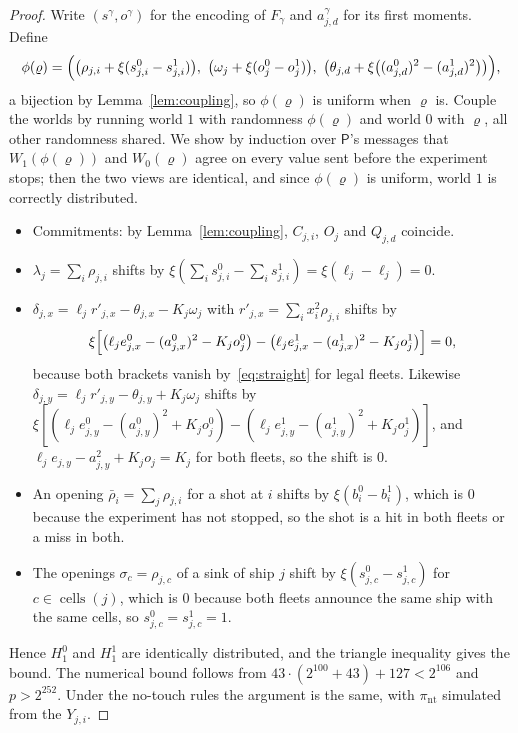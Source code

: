\documentclass[11pt]{article}
\theoremstyle{definition}
\theoremstyle{remark}
\newcommand{\cells}{\operatorname{cells}}
\begin{document}
\begin{proof}
Write $(s^\gamma,o^\gamma)$ for the encoding of $F_\gamma$ and $a^\gamma_{j,d}$ for its first moments. Define
\[
  \phi(\varrho)=\Bigl(\bigl(\rho_{j,i}+\xi(s^0_{j,i}-s^1_{j,i})\bigr),\ \bigl(\omega_j+\xi(o^0_j-o^1_j)\bigr),\ \bigl(\theta_{j,d}+\xi\bigl((a^0_{j,d})^2-(a^1_{j,d})^2\bigr)\bigr)\Bigr),
\]
a bijection by Lemma~\ref{lem:coupling}, so $\phi(\varrho)$ is uniform when $\varrho$ is. Couple the worlds by running world $1$ with randomness $\phi(\varrho)$ and world $0$ with $\varrho$, all other randomness shared. We show by induction over $\mathsf P$'s messages that $W_1(\phi(\varrho))$ and $W_0(\varrho)$ agree on every value sent before the experiment stops; then the two views are identical, and since $\phi(\varrho)$ is uniform, world $1$ is correctly distributed.
\begin{itemize}[leftmargin=2em]
  \item Commitments: by Lemma~\ref{lem:coupling}, $C_{j,i}$, $O_j$ and $Q_{j,d}$ coincide.
  \item $\lambda_j=\sum_i\rho_{j,i}$ shifts by $\xi(\sum_is^0_{j,i}-\sum_is^1_{j,i})=\xi(\ell_j-\ell_j)=0$.
  \item $\delta_{j,x}=\ell_jr'_{j,x}-\theta_{j,x}-K_j\omega_j$ with $r'_{j,x}=\sum_ix_i^2\rho_{j,i}$ shifts by
  \[
    \xi\Bigl[\bigl(\ell_je^0_{j,x}-(a^0_{j,x})^2-K_jo^0_j\bigr)-\bigl(\ell_je^1_{j,x}-(a^1_{j,x})^2-K_jo^1_j\bigr)\Bigr]=0,
  \]
  because both brackets vanish by~\eqref{eq:straight} for legal fleets. Likewise $\delta_{j,y}=\ell_jr'_{j,y}-\theta_{j,y}+K_j\omega_j$ shifts by $\xi[(\ell_je^0_{j,y}-(a^0_{j,y})^2+K_jo^0_j)-(\ell_je^1_{j,y}-(a^1_{j,y})^2+K_jo^1_j)]$, and $\ell_je_{j,y}-a_{j,y}^2+K_jo_j=K_j$ for both fleets, so the shift is $0$.
  \item An opening $\bar\rho_i=\sum_j\rho_{j,i}$ for a shot at $i$ shifts by $\xi(b^0_i-b^1_i)$, which is $0$ because the experiment has not stopped, so the shot is a hit in both fleets or a miss in both.
  \item The openings $\sigma_c=\rho_{j,c}$ of a sink of ship $j$ shift by $\xi(s^0_{j,c}-s^1_{j,c})$ for $c\in\cells(j)$, which is $0$ because both fleets announce the same ship with the same cells, so $s^0_{j,c}=s^1_{j,c}=1$.
\end{itemize}
Hence $H^0_1$ and $H^1_1$ are identically distributed, and the triangle inequality gives the bound. The numerical bound follows from $43\cdot(2^{100}+43)+127<2^{106}$ and $p>2^{252}$. Under the no-touch rules the argument is the same, with $\pi_{\mathrm{nt}}$ simulated from the $Y_{j,i}$.
\end{proof}
\end{document}
